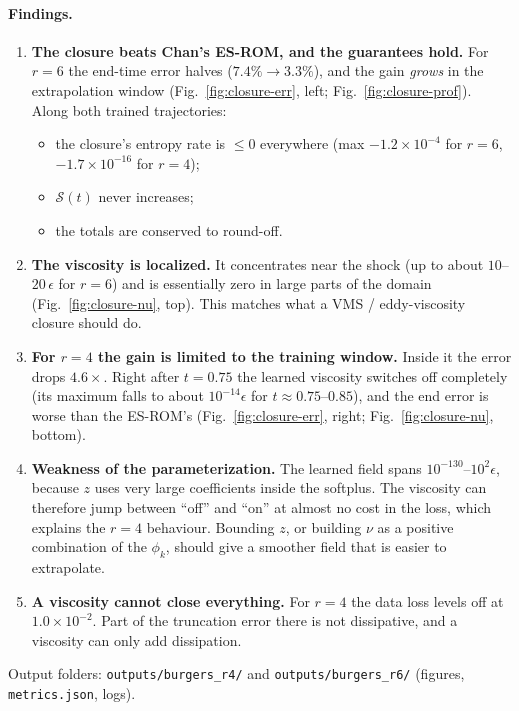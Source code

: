 \documentclass[11pt,a4paper]{article}
\newcommand{\code}[1]{\texttt{\small #1}}
\newcommand{\Sc}{\mathcal S}
\begin{document}
\paragraph{Findings.}
\begin{enumerate}
\item \textbf{The closure beats Chan's ES-ROM, and the guarantees hold.} For $r=6$ the end-time error halves ($7.4\%\to3.3\%$), and the gain \emph{grows} in the extrapolation window (Fig.~\ref{fig:closure-err}, left; Fig.~\ref{fig:closure-prof}). Along both trained trajectories:
  \begin{itemize}
  \item the closure's entropy rate is $\le0$ everywhere (max $-1.2\times10^{-4}$ for $r=6$, $-1.7\times10^{-16}$ for $r=4$);
  \item $\Sc(t)$ never increases;
  \item the totals are conserved to round-off.
  \end{itemize}
\item \textbf{The viscosity is localized.} It concentrates near the shock (up to about $10$--$20\,\epsilon$ for $r=6$) and is essentially zero in large parts of the domain (Fig.~\ref{fig:closure-nu}, top). This matches what a VMS / eddy-viscosity closure should do.
\item \textbf{For $r=4$ the gain is limited to the training window.} Inside it the error drops $4.6\times$. Right after $t=0.75$ the learned viscosity switches off completely (its maximum falls to about $10^{-14}\epsilon$ for $t\approx0.75$--$0.85$), and the end error is worse than the ES-ROM's (Fig.~\ref{fig:closure-err}, right; Fig.~\ref{fig:closure-nu}, bottom).
\item \textbf{Weakness of the parameterization.} The learned field spans $10^{-130}$--$10^{2}\epsilon$, because $z$ uses very large coefficients inside the softplus. The viscosity can therefore jump between ``off'' and ``on'' at almost no cost in the loss, which explains the $r=4$ behaviour. Bounding $z$, or building $\nu$ as a positive combination of the $\phi_k$, should give a smoother field that is easier to extrapolate.
\item \textbf{A viscosity cannot close everything.} For $r=4$ the data loss levels off at $1.0\times10^{-2}$. Part of the truncation error there is not dissipative, and a viscosity can only add dissipation.
\end{enumerate}
Output folders: \code{outputs/burgers\_r4/} and \code{outputs/burgers\_r6/} (figures, \code{metrics.json}, logs).
\end{document}
